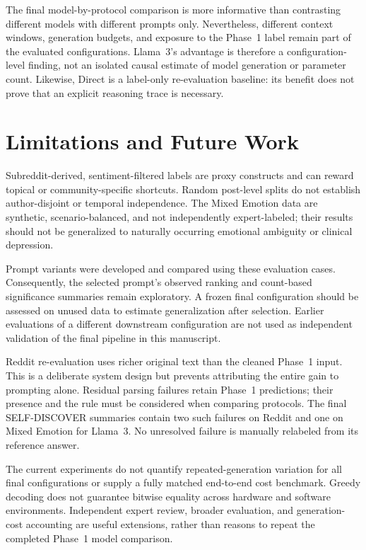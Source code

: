 \documentclass{ieeeaccess}
\begin{document}
The final model-by-protocol comparison is more informative than contrasting different models with different prompts only. Nevertheless, different context windows, generation budgets, and exposure to the Phase~1 label remain part of the evaluated configurations. Llama~3's advantage is therefore a configuration-level finding, not an isolated causal estimate of model generation or parameter count. Likewise, Direct is a label-only re-evaluation baseline: its benefit does not prove that an explicit reasoning trace is necessary.

\section{Limitations and Future Work}
Subreddit-derived, sentiment-filtered labels are proxy constructs and can reward topical or community-specific shortcuts. Random post-level splits do not establish author-disjoint or temporal independence. The Mixed Emotion data are synthetic, scenario-balanced, and not independently expert-labeled; their results should not be generalized to naturally occurring emotional ambiguity or clinical depression.

Prompt variants were developed and compared using these evaluation cases. Consequently, the selected prompt's observed ranking and count-based significance summaries remain exploratory. A frozen final configuration should be assessed on unused data to estimate generalization after selection. Earlier evaluations of a different downstream configuration are not used as independent validation of the final pipeline in this manuscript.

Reddit re-evaluation uses richer original text than the cleaned Phase~1 input. This is a deliberate system design but prevents attributing the entire gain to prompting alone. Residual parsing failures retain Phase~1 predictions; their presence and the rule must be considered when comparing protocols. The final SELF-DISCOVER summaries contain two such failures on Reddit and one on Mixed Emotion for Llama~3. No unresolved failure is manually relabeled from its reference answer.

The current experiments do not quantify repeated-generation variation for all final configurations or supply a fully matched end-to-end cost benchmark. Greedy decoding does not guarantee bitwise equality across hardware and software environments. Independent expert review, broader evaluation, and generation-cost accounting are useful extensions, rather than reasons to repeat the completed Phase~1 model comparison.
\end{document}
